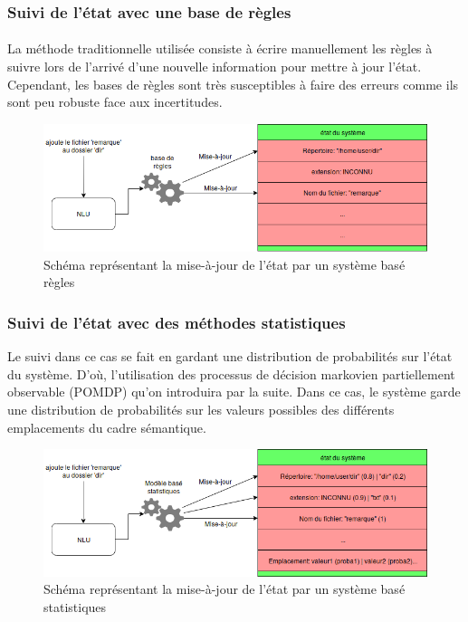 \subsubsection{Suivi de l’état avec une base de règles}
\paragraph{}
La méthode traditionnelle utilisée consiste à écrire manuellement les règles à suivre lors de l’arrivé d’une nouvelle information pour mettre à jour l’état\cite{Goddeau1996}. Cependant, les bases de règles sont très susceptibles à faire des erreurs\cite{Chen2017} comme ils sont peu robuste face aux incertitudes.


\begin{figure}[H]
	\centering
	\includegraphics[width=.7\linewidth]{images/DM/RuleBasedUpdate.png} 
	\caption{Schéma représentant la mise-à-jour de l'état par un système basé règles} 
\end{figure}

\subsubsection{Suivi de l’état avec des méthodes statistiques}
Le suivi dans ce cas se fait en gardant une distribution de probabilités sur l’état du système. D’où, l’utilisation des processus de décision markovien partiellement observable (POMDP)\cite{Young2010} qu’on introduira par la suite. Dans ce cas, le système garde une distribution de probabilités sur les valeurs possibles des différents emplacements du cadre sémantique.

\begin{figure}[H]
	\centering
	\includegraphics[width=.7\linewidth]{images/DM/StatBasedUpdate.png} 
	\caption{Schéma représentant la mise-à-jour de l'état par un système basé statistiques} 
\end{figure}

